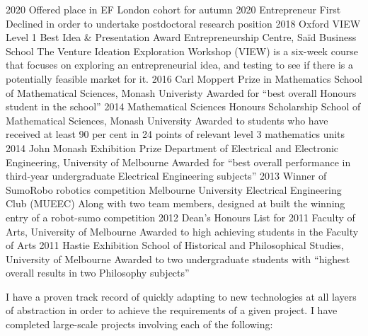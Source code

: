 \documentclass[9pt]{developercv} %
\begin{document}

\begin{entrylist}
  \entry
    {2020}
    {Offered place in EF London cohort for autumn 2020}
    {Entrepreneur First}
    {Declined in order to undertake postdoctoral research position}
  \entry
    {2018}
    {Oxford VIEW Level 1 Best Idea \& Presentation Award}
    {Entrepreneurship Centre, Sa\"id Business School}
    {The Venture Ideation Exploration Workshop (VIEW) is a six-week course that focuses on exploring an entrepreneurial idea, and testing to see if there is a potentially feasible market for it.}
  \entry
    {2016}
    {Carl Moppert Prize in Mathematics}
    {School of Mathematical Sciences, Monash Univeristy}
    {Awarded for ``best overall Honours student in the school''}
  \entry
    {2014}
    {Mathematical Sciences Honours Scholarship}
    {School of Mathematical Sciences, Monash University}
    {Awarded to students who have received at least 90 per cent in 24 points of relevant level 3 mathematics units}
  \entry
    {2014}
    {John Monash Exhibition Prize}
    {Department of Electrical and Electronic Engineering, University of Melbourne}
    {Awarded for ``best overall performance in third-year undergraduate Electrical Engineering subjects''}
  \entry
    {2013}
    {Winner of SumoRobo robotics competition}
    {Melbourne University Electrical Engineering Club (MUEEC)}
    {Along with two team members, designed at built the winning entry of a robot-sumo competition}
  \entry
    {2012}
    {Dean's Honours List for 2011}
    {Faculty of Arts, University of Melbourne}
    {Awarded to high achieving students in the Faculty of Arts}
  \entry
    {2011}
    {Hastie Exhibition}
    {School of Historical and Philosophical Studies, University of Melbourne}
    {Awarded to two undergraduate students with ``highest overall results in two Philosophy subjects''}
\end{entrylist}



I have a proven track record of quickly adapting to new technologies at all layers of abstraction in order to achieve the requirements of a given project.
I have completed large-scale projects involving each of the following:

\vspace{.25cm}
\end{document}
